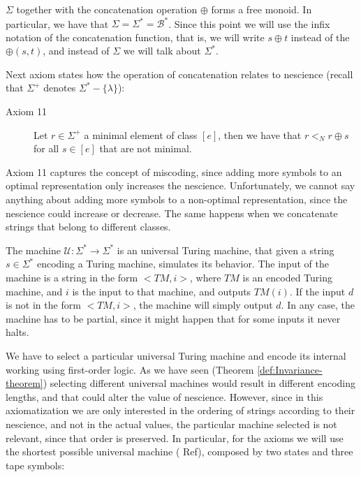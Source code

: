 \vskip 0.25cm

$\Sigma$ together with the concatenation operation $\oplus$ forms a free monoid. In particular, we have that $\Sigma = \Sigma^\ast = \mathcal{B}^\ast$. Since this point we will use the infix notation of the concatenation function, that is, we will write $s \oplus t$ instead of the $\oplus(s, t)$, and instead of $\Sigma$ we will talk about $\Sigma^\ast$.

Next axiom states how the operation of concatenation relates to nescience (recall that $\Sigma^{+}$ denotes $\Sigma^\ast-\{\lambda\}$):

\vskip 0.25cm

\begin{description}
\item[Axiom 11] Let $r \in \Sigma^{+}$ a minimal element of class $[e]$, then we have that $r <_N r \oplus s$ for all $s \in [e]$ that are not minimal.
\end{description}

\vskip 0.25cm

Axiom 11 captures the concept of miscoding, since adding more symbols to an optimal representation only increases the nescience. Unfortunately, we cannot say anything about adding more symbols to a non-optimal representation, since the nescience could increase or decrease. The same happens when we concatenate strings that belong to different classes. 

The machine $\mathcal{U} : \Sigma^\ast \rightarrow \Sigma^\ast$ is an universal Turing machine, that given a string $s \in \Sigma^\ast$ encoding a Turing machine, simulates its behavior. The input of the machine is a string in the form $<TM, i>$, where $TM$ is an encoded Turing machine, and $i$ is the input to that machine, and outputs $TM(i)$. If the input $d$ is not in the form $<TM, i>$, the machine will simply output $d$. In any case, the machine has to be partial, since it might happen that for some inputs it never halts.

We have to select a particular universal Turing machine and encode its internal working using first-order logic. As we have seen (Theorem \ref{def:Invariance-theorem}) selecting different universal machines would result in different encoding lengths, and that could alter the value of nescience. However, since in this axiomatization we are only interested in the ordering of strings according to their nescience, and not in the actual values, the particular machine selected is not relevant, since that order is preserved. In particular, for the axioms we will use the shortest possible universal machine ({\color{red} Ref}), composed by two states and three tape symbols:

